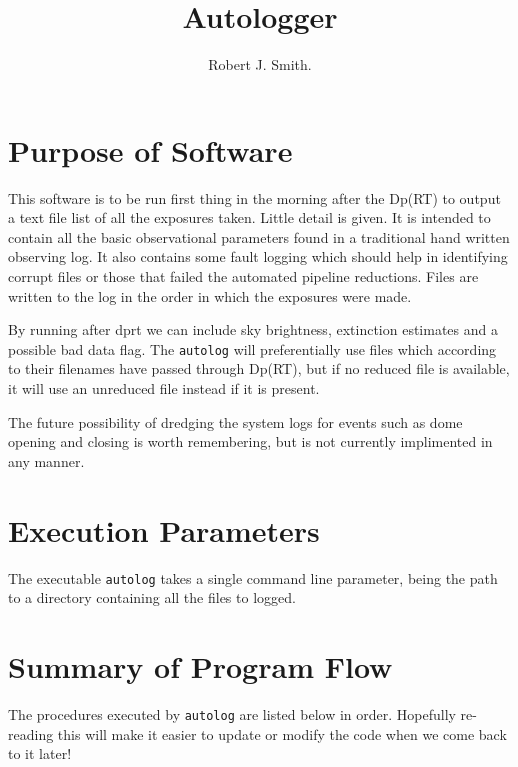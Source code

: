 \documentclass[10pt,a4paper]{article}
\title{Autologger}
\author{Robert J. Smith.}
\date{}
\begin{document}
\thispagestyle{empty}
\maketitle

\bigskip
\bigskip
\tableofcontents
\newpage


\section{Purpose of Software}

This software is to be run first thing in the morning after the Dp(RT)
to output a text file list of all the exposures taken. Little detail 
is given.  It is intended to contain all the basic observational 
parameters found in a traditional hand written observing log. It also 
contains some fault logging which should help in identifying corrupt 
files or those that failed the automated pipeline reductions.
Files are written to the log in the order in which the exposures
were made.

By running after dprt we can include sky brightness, extinction estimates 
and a possible bad data flag. The {\tt autolog} will preferentially use 
files which according to their filenames have passed through Dp(RT),
but if no reduced file is available, it will use an unreduced file 
instead if it is present.

The future possibility of dredging the system logs for events such as 
dome opening and closing is worth remembering, but is not currently
implimented in any manner.

\section{Execution Parameters}
The executable {\tt autolog} takes a single command line parameter,
being the path to a directory containing all the files to logged.


\section{Summary of Program Flow}
The procedures executed by {\tt autolog} are listed below in order. 
Hopefully re-reading this will make it easier to update or modify the
code when we come back to it later!
\end{document}
